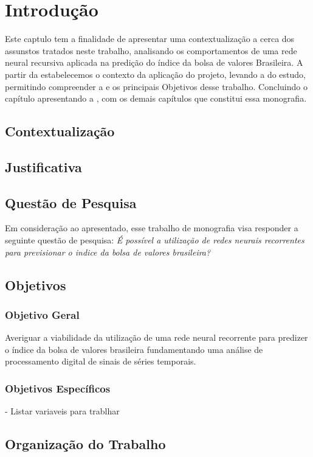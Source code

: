 \chapter[Introdução]{Introdução}
\label{sec:int}

Este captulo tem a finalidade de apresentar uma contextualização a cerca dos assunstos tratados neste trabalho, analisando os comportamentos de uma rede neural recursiva aplicada na predição do índice da bolsa de valores Brasileira. A partir da  estabelecemos o contexto da aplicação do projeto, levando a  do estudo, permitindo compreender a  e os principais Objetivos desse trabalho. Concluindo o capítulo apresentando a , com os demais capítulos que constitui essa monografia.

\section{Contextualização}
\label{sec:contex}


\section{Justificativa}
\label{sec:justificativa}

\section {Questão de Pesquisa}
\label{sec:qp}

Em consideração ao apresentado, esse trabalho de monografia visa responder a seguinte questão de pesquisa: \textit{É possível a utilização de redes neurais recorrentes para previsionar o indice da bolsa de valores brasileira?}

\section{Objetivos}
\label{sec:obj}


\subsection{Objetivo Geral}
\label{sec:objgeral}

Averiguar a viabilidade da utilização de uma rede neural recorrente para predizer o índice da bolsa de valores brasileira fundamentando uma análise de processamento digital de sinais de séries temporais.



\subsection{Objetivos Específicos}
\label{sec:objesp}

- Listar variaveis para trablhar

\section{Organização do Trabalho}
\label{sec:orgt}
